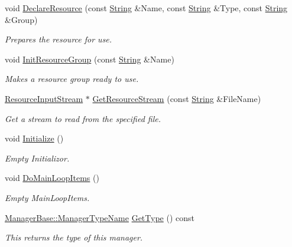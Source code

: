 \begin{DoxyCompactItemize}
void \hyperlink{classphys_1_1ResourceManager_a6ac7835a02dff32e60a73320f9c9dabb}{DeclareResource} (const \hyperlink{namespacephys_aa03900411993de7fbfec4789bc1d392e}{String} \&Name, const \hyperlink{namespacephys_aa03900411993de7fbfec4789bc1d392e}{String} \&Type, const \hyperlink{namespacephys_aa03900411993de7fbfec4789bc1d392e}{String} \&Group)
\begin{DoxyCompactList}\small\item\em Prepares the resource for use. \item\end{DoxyCompactList}\item 
void \hyperlink{classphys_1_1ResourceManager_aa2f44129dfc3dc0b0ee332a2bba6078d}{InitResourceGroup} (const \hyperlink{namespacephys_aa03900411993de7fbfec4789bc1d392e}{String} \&Name)
\begin{DoxyCompactList}\small\item\em Makes a resource group ready to use. \item\end{DoxyCompactList}\item 
\hyperlink{classphys_1_1ResourceInputStream}{ResourceInputStream} $\ast$ \hyperlink{classphys_1_1ResourceManager_a13f0aef080b9a353fe6c910c2781de50}{GetResourceStream} (const \hyperlink{namespacephys_aa03900411993de7fbfec4789bc1d392e}{String} \&FileName)
\begin{DoxyCompactList}\small\item\em Get a stream to read from the specified file. \item\end{DoxyCompactList}\item 
void \hyperlink{classphys_1_1ResourceManager_a9be3250f1f1153c9e079f82736eb00a8}{Initialize} ()
\begin{DoxyCompactList}\small\item\em Empty Initializor. \item\end{DoxyCompactList}\item 
void \hyperlink{classphys_1_1ResourceManager_a2114714999441c095bc28d3673c2490e}{DoMainLoopItems} ()
\begin{DoxyCompactList}\small\item\em Empty MainLoopItems. \item\end{DoxyCompactList}\item 
\hyperlink{classphys_1_1ManagerBase_aaa6ccddf23892eaccb898529414f80a5}{ManagerBase::ManagerTypeName} \hyperlink{classphys_1_1ResourceManager_a9e5468e5428f5c108c7b3c01e94eba46}{GetType} () const 
\begin{DoxyCompactList}\small\item\em This returns the type of this manager. \item\end{DoxyCompactList}\end{DoxyCompactItemize}
